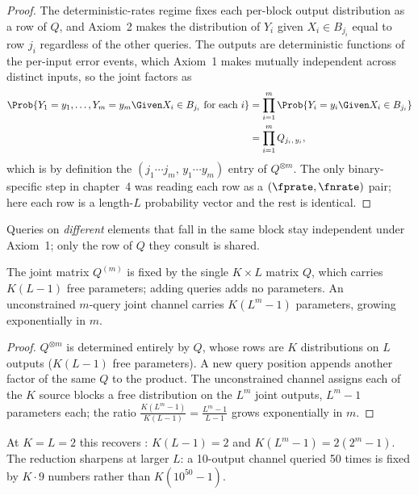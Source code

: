 \begin{proof}
The deterministic-rates regime fixes each per-block output distribution as a
row of $Q$, and Axiom~2 makes the distribution of $Y_i$ given $X_i \in B_{j_i}$
equal to row $j_i$ regardless of the other queries. The outputs are
deterministic functions of the per-input error events, which Axiom~1 makes
mutually independent across distinct inputs, so the joint factors as
\begin{align*}
  \Prob{Y_1 = y_1, \ldots, Y_m = y_m \Given X_i \in B_{j_i} \text{ for each } i}
  &= \prod_{i=1}^{m} \Prob{Y_i = y_i \Given X_i \in B_{j_i}} \\
  &= \prod_{i=1}^{m} Q_{j_i,\, y_i},
\end{align*}
which is by definition the $(j_1 \cdots j_m,\, y_1 \cdots y_m)$ entry of
$Q^{\otimes m}$. The only binary-specific step in chapter~4 was reading each
row as a $(\fprate, \fnrate)$ pair; here each row is a length-$L$ probability
vector and the rest is identical.
\end{proof}

Queries on \emph{different} elements that fall in the same block stay
independent under Axiom~1; only the row of $Q$ they consult is shared.

\begin{corollary}
\label{cor:n-ary-parameter-count}
The joint matrix $Q^{(m)}$ is fixed by the single $K \times L$ matrix $Q$, which
carries $K(L - 1)$ free parameters; adding queries adds no parameters. An
unconstrained $m$-query joint channel carries $K(L^m - 1)$ parameters, growing
exponentially in $m$.
\end{corollary}

\begin{proof}
$Q^{\otimes m}$ is determined entirely by $Q$, whose rows are $K$
distributions on $L$ outputs ($K(L-1)$ free parameters). A new query position
appends another factor of the same $Q$ to the product. The unconstrained
channel assigns each of the $K$ source blocks a free distribution on the $L^m$
joint outputs, $L^m - 1$ parameters each; the ratio
$\frac{K(L^m-1)}{K(L-1)} = \frac{L^m-1}{L-1}$ grows exponentially in $m$.
\end{proof}

At $K = L = 2$ this recovers : $K(L-1) = 2$ and
$K(L^m-1) = 2(2^m-1)$. The reduction sharpens at larger $L$: a 10-output
channel queried 50 times is fixed by $K \cdot 9$ numbers rather than
$K(10^{50}-1)$.

